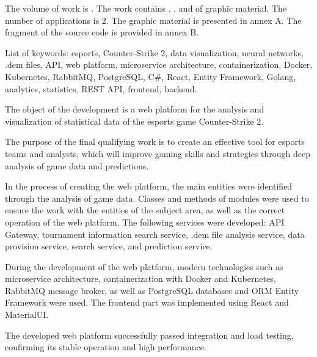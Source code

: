 The volume of work is . The work contains , ,  and  of graphic material. The number of applications is 2. The graphic material is presented in annex A. The fragment of the source code is provided in annex B.

List of keywords: esports, Counter-Strike 2, data visualization, neural networks, .dem files, API, web platform, microservice architecture, containerization, Docker, Kubernetes, RabbitMQ, PostgreSQL, C\#, React, Entity Framework, Golang, analytics, statistics, REST API, frontend, backend.

The object of the development is a web platform for the analysis and visualization of statistical data of the esports game Counter-Strike 2.

The purpose of the final qualifying work is to create an effective tool for esports teams and analysts, which will improve gaming skills and strategies through deep analysis of game data and predictions.

In the process of creating the web platform, the main entities were identified through the analysis of game data. Classes and methods of modules were used to ensure the work with the entities of the subject area, as well as the correct operation of the web platform. The following services were developed: API Gateway, tournament information search service, .dem file analysis service, data provision service, search service, and prediction service.

During the development of the web platform, modern technologies such as microservice architecture, containerization with Docker and Kubernetes, RabbitMQ message broker, as well as PostgreSQL databases and ORM Entity Framework were used. The frontend part was implemented using React and MaterialUI.

The developed web platform successfully passed integration and load testing, confirming its stable operation and high performance.

